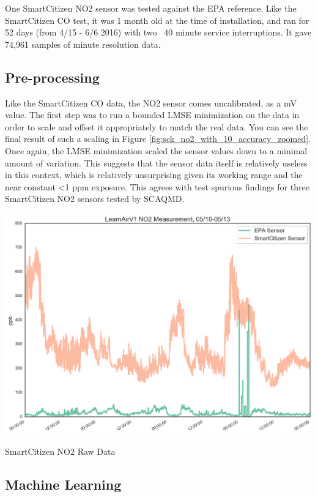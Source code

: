 One SmartCitizen NO2 sensor was tested against the EPA reference.  Like the SmartCitizen CO test, it was 1 month old at the time of installation, and ran for 52 days (from 4/15 - 6/6 2016) with two ~40 minute service interruptions.  It gave 74,961 samples of minute resolution data.


\subsection{Pre-processing}

Like the SmartCitizen CO data, the NO2 sensor comes uncalibrated, as a mV value.  The first step was to run a bounded LMSE minimization on the data in order to scale and offset it appropriately to match the real data.  You can see the final result of such a scaling in Figure \ref{fig:sck_no2_with_10_accuracy_zoomed}.  Once again, the LMSE minimization scaled the sensor values down to a minimal amount of variation.  This suggests that the sensor data itself is relatively useless in this context, which is relatively unsurprising given its working range and the near constant <1 ppm exposure.  This agrees with test spurious findings for three SmartCitizen NO2 sensors tested by SCAQMD.   

\begin{marginfigure}
 	\includegraphics[width=\textwidth]{figs/no2_sck_zoomed}               
 	 \caption{SmartCitizen NO2 Raw Data}
  	\label{fig:sck_no2_raw_zoomed}
\end{marginfigure}

\subsection{Machine Learning}

